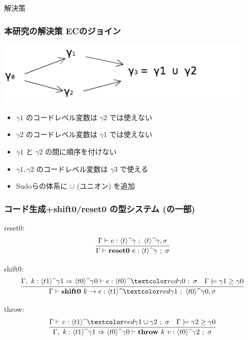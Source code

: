


\begin{frame}
  \center
  \huge{解決策}
\end{frame}

\begin{frame}
  \frametitle{本研究の解決策 ECのジョイン}
  \flushleft
  \includegraphics[clip,height=3cm]{./img/ecgraph.png}
  \begin{itemize}
  \item<2-> $\gamma1$ のコードレベル変数は $\gamma2$ では使えない
  \item<2-> $\gamma2$ のコードレベル変数は $\gamma1$ では使えない
  \item<3->[$\Rightarrow$] $\gamma1$ と $\gamma2$ の間に順序を付けない
  \end{itemize}

  \begin{itemize}
  \item<4-> $\gamma1, \gamma2$ のコードレベル変数は $\gamma3$ で使える
  \item<5->[$\Rightarrow$] Sudoらの体系に $\cup$ (ユニオン) を追加
  \end{itemize}
\end{frame}

\begin{frame}[fragile]
  \frametitle{コード生成+shift0/reset0 の型システム\small{ (の一部)}}
  reset0:
  \[
    \infer{\Gamma \vdash \resetz{e} : \codeTs{t}{\gamma} ~;~ \sigma}
    {\Gamma \vdash e : \codeTs{t}{\gamma} ~;~ \codeTs{t}{\gamma}, \sigma}
  \]

  shift0:
  \[
    \infer{\Gamma \vdash \shiftz{k}{e} : \codeTs{t1}{\red{\gamma1}} ~;~ \codeTs{t0}{\gamma0},\sigma}
    {\Gamma,~k:\contT{\codeTs{t1}{\gamma1}}{\codeTs{t0}{\gamma0}}
      \vdash e : \codeTs{t0}{\red{\gamma0}} ~;~ \sigma
      & \Gamma \models \gamma1 \ord \gamma0
    }
  \]

  throw:
  \[
    \infer
    {\Gamma,~k:\contT{\codeTs{t1}{\gamma1}}{\codeTs{t0}{\gamma0}}
      \vdash \throw{k}{v} : \codeTs{t0}{\gamma2} ~;~ \sigma}
    {\Gamma
      \vdash v : \codeTs{t1}{\red{\gamma1 \cup \gamma2}} ~;~ \sigma
      & \Gamma \models \gamma2 \ord \gamma0
    }
  \]
\end{frame}


